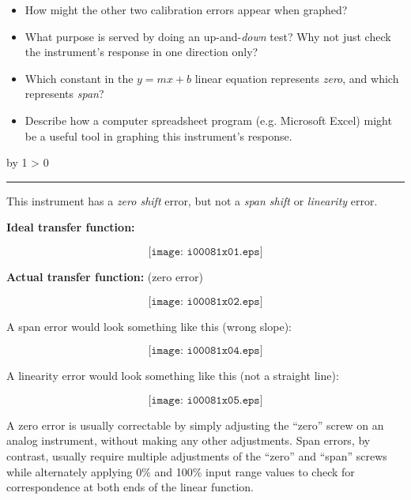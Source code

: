 \documentclass[12pt,a4paper]{article}
\def\svar{
           \advance\answnum by 1
           \ifnum \answnum > 0
                \hrule
                \vskip 3pt
                \leftline{Svar \the\answnum}
                \vskip 3pt \fi}
\begin{document}
\begin{itemize}
\item{} How might the other two calibration errors appear when graphed?
\item{} What purpose is served by doing an up-and-{\it down} test?  Why not just check the instrument's response in one direction only?
\item{} Which constant in the $y = mx + b$ linear equation represents {\it zero}, and which represents {\it span}?
\item{} Describe how a computer spreadsheet program (e.g. Microsoft Excel) might be a useful tool in graphing this instrument's response.
\end{itemize}

\vskip 10pt \filbreak 





\svar{} 

This instrument has a {\it zero shift} error, but not a {\it span shift} or {\it linearity} error.

\vskip 10pt

\noindent
{\bf Ideal transfer function:}

$$\texttt{[image: i00081x01.eps]}$$

\vskip 10pt

\noindent
{\bf Actual transfer function:} (zero error)

$$\texttt{[image: i00081x02.eps]}$$

\vskip 10pt

\filbreak

\noindent
A span error would look something like this (wrong slope):

$$\texttt{[image: i00081x04.eps]}$$

\vskip 10pt

\noindent
A linearity error would look something like this (not a straight line):

$$\texttt{[image: i00081x05.eps]}$$

\vskip 10pt

A zero error is usually correctable by simply adjusting the ``zero'' screw on an analog instrument, without making any other adjustments.  Span errors, by contrast, usually require multiple adjustments of the ``zero'' and ``span'' screws while alternately applying 0\% and 100\% input range values to check for correspondence at both ends of the linear function.
\end{document}
